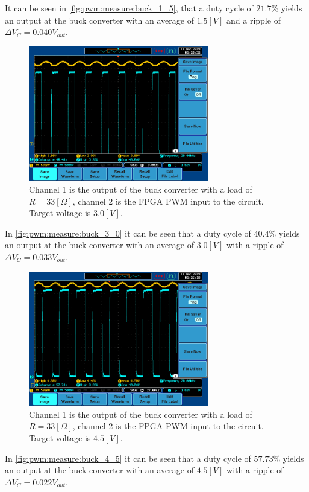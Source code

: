 \documentclass[../report.tex]{subfiles}
\begin{document}
It can be seen in \autoref{fig:pwm:measure:buck_1_5}, that a duty cycle of $21.7 \%$ yields an output at the buck converter with an average of $1.5[V]$ and a ripple of $\Delta V_C = 0.040 V_{out}$.
\begin{figure}[H]
    \centering
         \includegraphics[width=0.7\textwidth]{figures/measurements/3_0_V_BOTH_PWRES.PNG}
     \caption{Channel 1 is the output of the buck converter with a load of $R = 33 [\Omega]$, channel 2 is the FPGA PWM input to the circuit. Target voltage is $3.0[V]$.}
     \label{fig:pwm:measure:buck_3_0}
\end{figure}
In \autoref{fig:pwm:measure:buck_3_0} it can be seen that a duty cycle of $40.4 \%$ yields an output at the buck converter with an average of $3.0 [V]$ with a ripple of $\Delta V_C = 0.033 V_{out}$.
\begin{figure}[H]
    \centering
         \includegraphics[width=0.7\textwidth]{figures/measurements/4_5_V_BOTH_PWRES.PNG}
     \caption{Channel 1 is the output of the buck converter with a load of $R = 33 [\Omega]$, channel 2 is the FPGA PWM input to the circuit. Target voltage is $4.5[V]$.}
     \label{fig:pwm:measure:buck_4_5}
\end{figure}
In \autoref{fig:pwm:measure:buck_4_5} it can be seen that a duty cycle of $57.73 \%$ yields an output at the buck converter with an average of $4.5 [V]$ with a ripple of $\Delta V_C = 0.022 V_{out}$.
\end{document}
